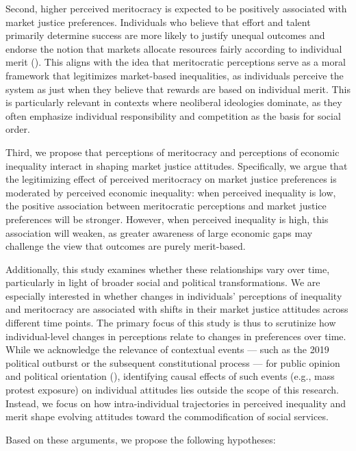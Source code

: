 \documentclass[
  12pt,
]{article}
\begin{document}
Second, higher perceived meritocracy is expected to be positively
associated with market justice preferences. Individuals who believe that
effort and talent primarily determine success are more likely to justify
unequal outcomes and endorse the notion that markets allocate resources
fairly according to individual merit
().
This aligns with the idea that meritocratic perceptions serve as a moral
framework that legitimizes market-based inequalities, as individuals
perceive the system as just when they believe that rewards are based on
individual merit. This is particularly relevant in contexts where
neoliberal ideologies dominate, as they often emphasize individual
responsibility and competition as the basis for social order.

Third, we propose that perceptions of meritocracy and perceptions of
economic inequality interact in shaping market justice attitudes.
Specifically, we argue that the legitimizing effect of perceived
meritocracy on market justice preferences is moderated by perceived
economic inequality: when perceived inequality is low, the positive
association between meritocratic perceptions and market justice
preferences will be stronger. However, when perceived inequality is
high, this association will weaken, as greater awareness of large
economic gaps may challenge the view that outcomes are purely
merit-based.

Additionally, this study examines whether these relationships vary over
time, particularly in light of broader social and political
transformations. We are especially interested in whether changes in
individuals' perceptions of inequality and meritocracy are associated
with shifts in their market justice attitudes across different time
points. The primary focus of this study is thus to scrutinize how
individual-level changes in perceptions relate to changes in preferences
over time. While we acknowledge the relevance of contextual events ---
such as the 2019 political outburst or the subsequent constitutional
process --- for public opinion and political orientation
(), identifying causal effects of such events (e.g., mass protest
exposure) on individual attitudes lies outside the scope of this
research. Instead, we focus on how intra-individual trajectories in
perceived inequality and merit shape evolving attitudes toward the
commodification of social services.

Based on these arguments, we propose the following hypotheses:
\end{document}
